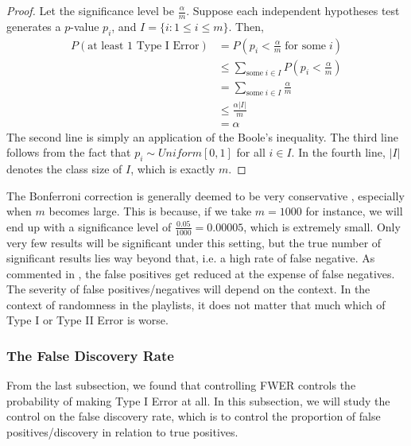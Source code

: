\documentclass[12pt]{article}
\theoremstyle{plain}
\theoremstyle{definition}
\theoremstyle{remark}
\begin{document}
\begin{proof}\cite{5.3}
Let the significance level be $\frac{\alpha}{m}$. Suppose each independent hypotheses test generates a $p$-value $p_i$, and $I=\{i:1\leq i\leq m\}$. Then,
\begin{align*}
    P(\text{at least 1 Type I Error})&=P(p_i<\frac{\alpha}{m}\; \text{for some} \;i)\\
    &\leq\sum_{\text{some}\; i\in I} P(p_i<\frac{\alpha}{m})\\
    &=\sum_{\text{some}\; i\in I}\frac{\alpha}{m}\\
    &\leq\frac{\alpha|I|}{m}\\
    &=\alpha
\end{align*}
The second line is simply an application of the Boole's inequality. The third line follows from the fact that $p_i\sim Uniform[0,1]$ for all $i\in I$. In the fourth line, $|I|$ denotes the class size of $I$, which is exactly $m$. 
\end{proof}

The Bonferroni correction is generally deemed to be very conservative \cite{5.4}\cite{5.1}\cite{5.3}\cite{5.5}\cite{5.6}, especially when $m$ becomes large. This is because, if we take $m=1000$ for instance, we will end up with a significance level of $\frac{0.05}{1000}=0.00005$, which is extremely small. Only very few results will be significant under this setting, but the true number of significant results lies way beyond that, i.e. a high rate of false negative. As commented in \cite{5.5}, the false positives get reduced at the expense of false negatives. The severity of false positives/negatives will depend on the context. In the context of randomness in the playlists, it does not matter that much which of Type I or Type II Error is worse.

\newpage
\subsubsection{The False Discovery Rate}
From the last subsection, we found that controlling FWER controls the probability of making Type I Error at all. In this subsection, we will study the control on the false discovery rate, which is to control the proportion of false positives/discovery in relation to true positives. 
\end{document}
